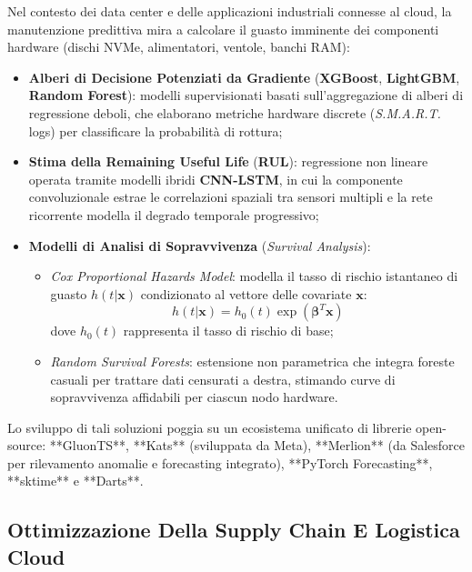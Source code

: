 \documentclass[11pt, a4paper]{article}
\begin{document}
Nel contesto dei data center e delle applicazioni industriali connesse al cloud, la manutenzione predittiva mira a calcolare il guasto imminente dei componenti hardware (dischi NVMe, alimentatori, ventole, banchi RAM):
\begin{itemize}
    \item \textbf{Alberi di Decisione Potenziati da Gradiente} (\textbf{XGBoost}, \textbf{LightGBM}, \textbf{Random Forest}): modelli supervisionati basati sull'aggregazione di alberi di regressione deboli, che elaborano metriche hardware discrete (\emph{S.M.A.R.T.} logs) per classificare la probabilità di rottura;
    \item \textbf{Stima della Remaining Useful Life} (\textbf{RUL}): regressione non lineare operata tramite modelli ibridi \textbf{CNN-LSTM}, in cui la componente convoluzionale estrae le correlazioni spaziali tra sensori multipli e la rete ricorrente modella il degrado temporale progressivo;
    \item \textbf{Modelli di Analisi di Sopravvivenza} (\emph{Survival Analysis}):
    \begin{itemize}
        \item \emph{Cox Proportional Hazards Model}: modella il tasso di rischio istantaneo di guasto $h(t | \bm{x})$ condizionato al vettore delle covariate $\bm{x}$:
        \begin{equation}
            h(t | \bm{x}) = h_0(t) \exp(\bm{\beta}^T \bm{x})
        \end{equation}
        dove $h_0(t)$ rappresenta il tasso di rischio di base;
        \item \emph{Random Survival Forests}: estensione non parametrica che integra foreste casuali per trattare dati censurati a destra, stimando curve di sopravvivenza affidabili per ciascun nodo hardware.
    \end{itemize}
\end{itemize}

Lo sviluppo di tali soluzioni poggia su un ecosistema unificato di librerie open-source: **GluonTS**, **Kats** (sviluppata da Meta), **Merlion** (da Salesforce per rilevamento anomalie e forecasting integrato), **PyTorch Forecasting**, **sktime** e **Darts**.


\subsection{Ottimizzazione Della Supply Chain E Logistica Cloud}
\end{document}

